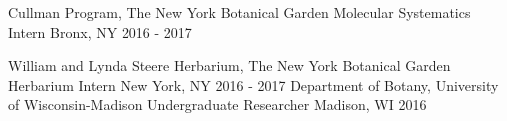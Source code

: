 \begin{cventries}
  \cventry
    {Cullman Program, The New York Botanical Garden} %
    {Molecular Systematics Intern} %
    {Bronx, NY} %
    {2016 - 2017} %

  \cventry
    {William and Lynda Steere Herbarium, The New York Botanical Garden} %
    {Herbarium Intern} %
    {New York, NY} %
    {2016 - 2017} %
     \cventry
    {Department of Botany, University of Wisconsin-Madison} %
    {Undergraduate Researcher} %
    {Madison, WI} %
    {2016} %
\end{cventries}
